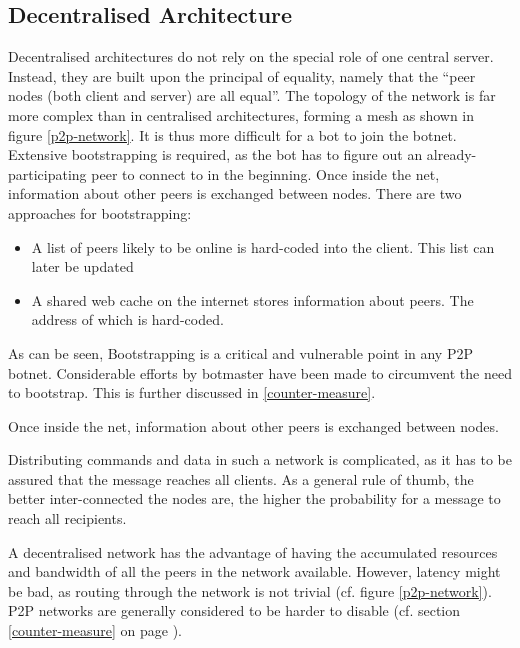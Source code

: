 \documentclass{llncs}
\begin{document}
\subsection{Decentralised Architecture}
\label{decent}
Decentralised architectures do not rely on the special role of one
central server. Instead, they are built upon the principal of
equality, namely that the ``peer nodes (both client and server) are
all equal''\cite{steggink2007detection}. The topology of the network
is far more complex than in centralised architectures, forming a mesh
as shown in figure \ref{p2p-network}. It is thus more difficult for a
bot to join the botnet. Extensive bootstrapping is required, as the
bot has to figure out an already-participating peer to connect to in the
beginning. Once inside the net, information about other peers is
exchanged between nodes. There are two approaches for bootstrapping\cite{wang2009systematic}:
\begin{itemize}
\item A list of peers likely to be online is hard-coded into the client. This list can later be updated
\item A shared web cache on the internet stores information about
  peers. The address of which is hard-coded.
\end{itemize}

As can be seen, Bootstrapping is a critical and vulnerable point in
any P2P botnet. Considerable efforts by botmaster have been made to
circumvent the need to bootstrap\cite{td1sc}. This is further
discussed in \ref{counter-measure}.

Once inside the net, information about other peers is
exchanged between nodes.

Distributing commands and data in such a network is complicated, as it
has to be assured that the message reaches all clients. As a general
rule of thumb, the better inter-connected the nodes are, the higher
the probability for a message to reach all recipients.

A decentralised network has the advantage of having the accumulated
resources and bandwidth of all the peers in the network
available. However, latency might be bad, as routing through the
network is not trivial (cf. figure \ref{p2p-network}). P2P networks
are generally considered to be harder to disable (cf. section
\ref{counter-measure} on page \pageref{counter-measure}).
\end{document}
